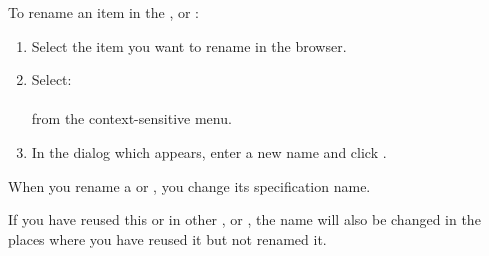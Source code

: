 
To rename an item in the \gdtestcasebrowser{}, \gdtestsuitebrowser{} or \gdcompnamebrowser{}:

\begin{enumerate}
\item Select the item you want to rename in the browser. 
\item Select:\\
\\
from the context-sensitive menu. 
\item In the dialog which appears, enter a new name and click . 
\end{enumerate}


When you rename a \gdcase{} or \gdsuite{}, you change its specification name. 

If you have reused this \gdcase{} or \gdsuite{} in other \gdcases{}, \gdsuites{} or \gdjobs{}, the name will also be changed in the places where you have reused it but not renamed it. 

